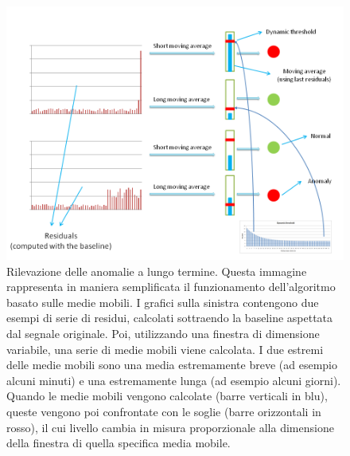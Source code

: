\documentclass[12pt,a4paper,cucitura]{toptesi}
\begin{document}
\begin{figure}
\centering
\includegraphics[width=\linewidth]{movavg.png}
\caption[Rilevazione delle anomalie a lungo termine]{Rilevazione delle anomalie a lungo termine. Questa immagine rappresenta in maniera semplificata il funzionamento dell'algoritmo basato sulle medie mobili. I grafici sulla sinistra contengono due esempi di serie di residui, calcolati sottraendo la baseline aspettata dal segnale originale. Poi, utilizzando una finestra di dimensione variabile, una serie di medie mobili viene calcolata. I due estremi delle medie mobili sono una media estremamente breve (ad esempio alcuni minuti) e una estremamente lunga (ad esempio alcuni giorni). Quando le medie mobili vengono calcolate (barre verticali in blu), queste vengono poi confrontate con le soglie (barre orizzontali in rosso), il cui livello cambia in misura proporzionale alla dimensione della finestra di quella specifica media mobile.}
\label{img:media}
\end{figure}
\end{document}
